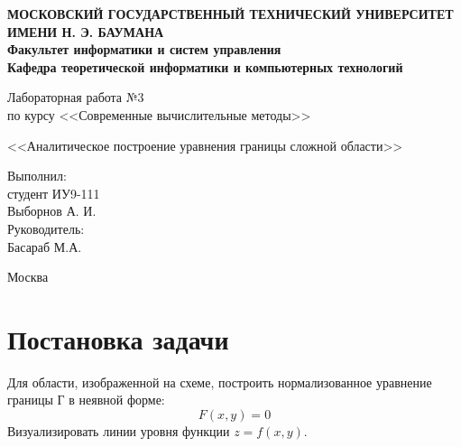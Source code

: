 \documentclass[12pt,a4paper,oneside]{extarticle}
\begin{document}
\pgfplotsset{compat=1.8}

\thispagestyle{empty}
\newpage
{
\centering


\textbf{
МОСКОВСКИЙ ГОСУДАРСТВЕННЫЙ ТЕХНИЧЕСКИЙ УНИВЕРСИТЕТ ИМЕНИ Н. Э. БАУМАНА \\
Факультет информатики и систем управления \\
Кафедра теоретической информатики и компьютерных технологий}
\bigskip
\bigskip
\bigskip
\bigskip
\bigskip
\bigskip
\bigskip

\vfill


Лабораторная работа №3 \\
по курсу <<Современные вычислительные методы>>

\bigskip

{\large <<Аналитическое построение уравнения границы сложной области>>}
\bigskip

\vfill



\hfill\parbox{4cm} {
Выполнил:\\
студент ИУ9-111 \hfill \\
Выборнов А. И.\hfill \medskip\\
Руководитель:\\
Басараб М.А.\hfill
}


\vspace{\fill}

Москва \number\year
\clearpage
}

\clearpage


\section{Постановка задачи}
    Для области, изображенной на схеме, построить нормализованное уравнение границы Г в неявной форме:
    $$F (x, y) = 0$$
    Визуализировать линии уровня функции $z = f (x, y)$.
\end{document}
